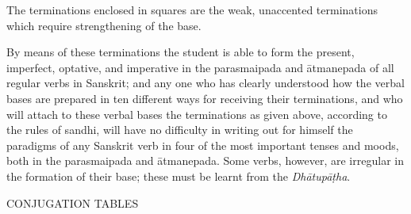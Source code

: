 



The terminations enclosed in squares are the weak, unaccented
terminations which require strengthening of the base.

\s By means of these terminations the student is able to form the
present, imperfect, optative, and imperative in the parasmaipada and
ātmanepada of all regular verbs in Sanskrit; and any one who has clearly
understood how the verbal bases are prepared in ten different ways for
receiving their terminations, and who will attach to these verbal bases
the terminations as given above, according to the rules of sandhi, will
have no difficulty in writing out for himself the paradigms of any
Sanskrit verb in four of the most important tenses and moods, both in
the parasmaipada and ātmanepada. Some verbs, however, are irregular in
the formation of their base; these must be learnt from the
\emph{Dhātupāṭha}.

CONJUGATION TABLES